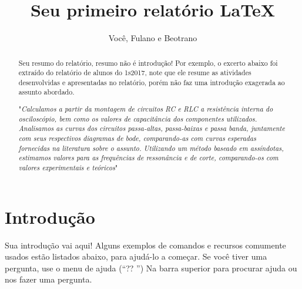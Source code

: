 \documentclass[a4paper]{article}
\title{Seu primeiro relatório \LaTeX}
\author{Você, Fulano e Beotrano}
\begin{document}
\maketitle

\begin{abstract}
Seu resumo do relatório, resumo não é introdução! Por exemplo, o excerto abaixo foi extraído do relatório de alunos do 1s2017, note que ele resume as atividades desenvolvidas e apresentadas no relatório, porém não faz uma introdução exagerada ao assunto abordado.

"\textit{Calculamos a partir da montagem de circuitos RC e RLC a resistência interna do osciloscópio, bem como os valores de capacitância dos componentes utilizados. Analisamos as curvas dos circuitos passa-altas, passa-baixas e passa banda, juntamente com seus respectivos diagramas de bode, comparando-as com curvas esperadas fornecidas na literatura sobre o assunto. Utilizando um método baseado em assíndotas, estimamos valores para as frequências de ressonância e de corte, comparando-os com valores experimentais e teóricos}"
\end{abstract}

\section{Introdução}

Sua introdução vai aqui! Alguns exemplos de comandos e recursos comumente usados estão listados abaixo, para ajudá-lo a começar. Se você tiver uma pergunta, use o menu de ajuda (``?? '') Na barra superior para procurar ajuda ou nos fazer uma pergunta.
\end{document}
